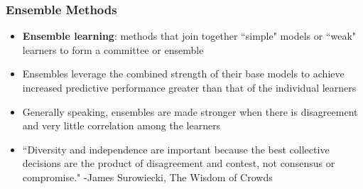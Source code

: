 \documentclass{beamer}
\begin{document}
\begin{frame}

    \frametitle{Ensemble Methods}
    
    \begin{itemize}
        \item \textbf{Ensemble learning}: methods that join together ``simple" 
              models or ``weak" learners to form a committee or ensemble
        \medskip
        \item Ensembles leverage the combined strength of their base models
              to achieve increased predictive performance greater than that of
              the individual learners
        \medskip
        \item Generally speaking, ensembles are made stronger when there is
              disagreement and very little correlation among the learners
        \medskip
        \item ``Diversity and independence are important because the best 
           collective decisions are the product of disagreement and contest, not 
           consensus or compromise." -James Surowiecki, The Wisdom of Crowds
    \end{itemize}

\end{frame}



\end{document}
